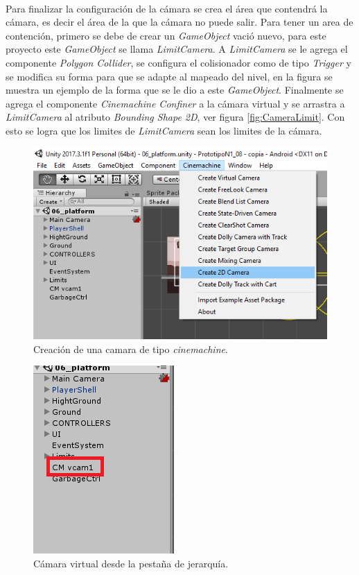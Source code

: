 \\
\par
Para finalizar la configuración de la cámara se crea el área que contendrá la cámara, es decir el área de la que la cámara no puede salir. Para tener un area de contención, primero se debe de crear un \textit{GameObject} vació nuevo, para este proyecto este \textit{GameObject} se llama \textit{LimitCamera}. A \textit{LimitCamera} se le agrega el componente \textit{Polygon Collider}, se configura el colisionador como de tipo \textit{Trigger} y se modifica su forma para que se adapte al mapeado del nivel, en la figura se muestra un ejemplo de la forma que se le dio a este \textit{GameObject}. Finalmente se agrega el componente \textit{Cinemachine Confiner} a la cámara virtual y se arrastra a \textit{LimitCamera} al atributo \textit{Bounding Shape 2D}, ver figura \ref{fig:CameraLimit}. Con esto se logra que los limites de \textit{LimitCamera} sean los limites de la cámara.

\begin{figure}[h]
		\centering
		\includegraphics[height=0.2 \textheight]{03TrabajoRealizado/imagenes/cinemachine0001.png}
		\caption{Creación de una camara de tipo \textit{cinemachine}.}
		\label{fig:CinemachineCreate}
\end{figure}

\begin{figure}[h]
		\centering
		\includegraphics[height=0.2 \textheight]{03TrabajoRealizado/imagenes/cinemachine0002.png}
		\caption{Cámara virtual desde la pestaña de jerarquía.}
		\label{fig:VitualCamera}
\end{figure}

